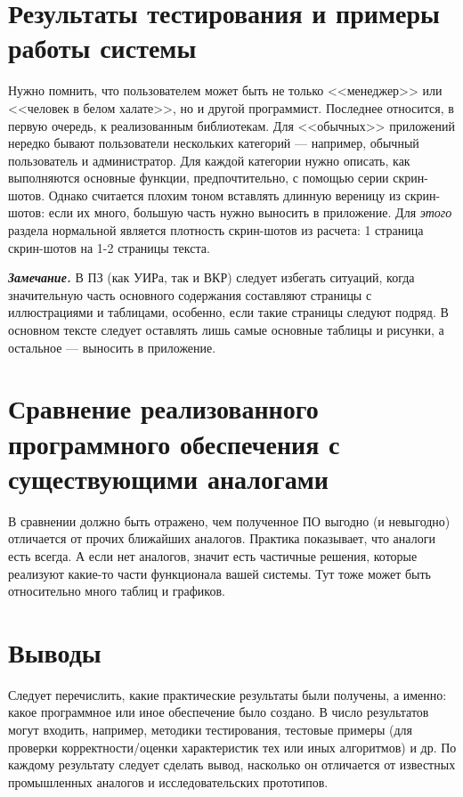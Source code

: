 \section{Результаты тестирования и примеры работы системы}

Нужно помнить, что пользователем может быть не только <<менеджер>> или <<человек в белом халате>>, но и другой программист. Последнее относится, в первую очередь, к реализованным библиотекам. Для <<обычных>> приложений нередко бывают пользователи нескольких категорий --- например, обычный пользователь и администратор. Для каждой категории нужно описать, как выполняются основные функции, предпочтительно, с помощью серии скрин-шотов. Однако считается плохим тоном вставлять длинную вереницу из скрин-шотов: если их много, большую часть нужно выносить в приложение. Для \textit{этого} раздела нормальной является плотность скрин-шотов из расчета: 1 страница скрин-шотов на 1-2 страницы текста.

\textit{\textbf{Замечание.}} В ПЗ (как УИРа, так и ВКР) следует избегать ситуаций, когда значительную часть основного содержания составляют страницы с иллюстрациями и таблицами, особенно, если такие страницы следуют подряд. В основном тексте следует оставлять лишь самые основные таблицы и рисунки, а остальное --- выносить в приложение.


\section{Сравнение реализованного программного обеспечения с существующими аналогами}

В сравнении должно быть отражено, чем полученное ПО выгодно (и невыгодно) отличается от прочих ближайших аналогов. Практика показывает, что аналоги есть всегда. А если нет аналогов, значит есть частичные решения, которые реализуют какие-то части функционала вашей системы. Тут тоже может быть относительно много таблиц и графиков.



\section{Выводы}

Следует перечислить, какие практические результаты были получены, а именно: какое программное или иное обеспечение было создано. В число результатов могут входить, например, методики тестирования, тестовые примеры (для проверки корректности/оценки характеристик тех или иных алгоритмов) и др. По каждому результату следует сделать вывод, насколько он отличается от известных промышленных аналогов и исследовательских прототипов.


